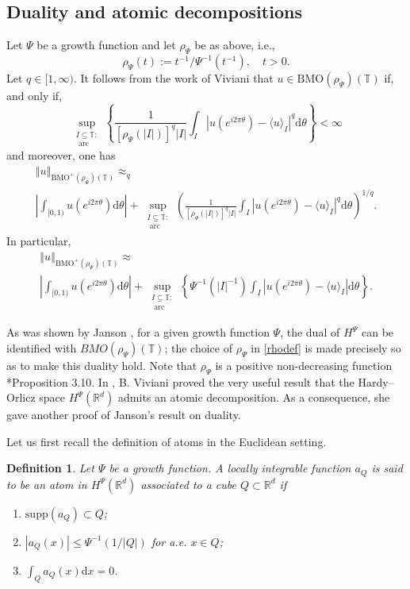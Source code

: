 \documentclass[a4paper, leqno, 10pt]{amsart}
\numberwithin{equation}{section}
\newtheorem{define}[thm]{Definition}
\newcommand{\dd}{\mathrm{d}}
\newcommand{\T}{\mathbb{T}}
\newcommand{\R}{\mathbb{R}}
\newcommand{\norm}[1]{\left\Vert#1\right\Vert}
\newcommand{\abs}[1]{\left|#1\right|}
\begin{document}
%
    
\subsection{Duality and atomic decompositions} Let $\Psi$ be a growth function and let $\rho_{\Psi}$ be as above, i.e.,
\begin{equation}
\rho_{\Psi} (t):=t^{-1} /\Psi^{-1} (t^{-1}), \quad  t > 0. 
\label{rhodef}
\end{equation}
Let $q \in [1, \infty)$. It follows from the work of Viviani \cite{V} that $u \in \mathrm{BMO} (\rho_{\Psi}) (\T)$ if, and only if,
\[
 \sup_{\substack{ I \subseteq \T  : \\  \text{ arc } }} \left\{ \frac{1} { \left[ \rho_{\Psi} (|I|) \right]^q |I|} \int_{I} \abs{u (e^{ i 2 \pi \theta}) - \langle u \rangle_I}^q \dd \theta \right\} < \infty 
\]
and moreover, one has
\begin{multline}\label{BMO_Psi_norms}
\norm{u}_{\mathrm{BMO}^+ (\rho_{\Psi}) (\T)} \approx_q \\
\abs{ \int_{[0,1)} u ( e^{ i 2 \pi \theta} ) \dd \theta} + \sup_{\substack{ I \subseteq \T  : \\  \text{ arc } }}  \left( \frac{1} { \left[ \rho_{\Psi} (|I|) \right]^q |I|}  \int_{I} \abs{u (e^{ i 2 \pi \theta}) - \langle u \rangle_I}^q \dd \theta \right)^{1/q} .
\end{multline}
In particular, 
\begin{multline}\label{BMO_Psi_1}
\norm{u}_{\mathrm{BMO}^+ (\rho_{\Psi}) (\T)} \approx \\
\abs{ \int_{[0,1)} u ( e^{ i 2 \pi \theta} ) \dd \theta} + \sup_{\substack{ I \subseteq \T  : \\  \text{ arc } }} \left\{ \Psi^{-1} ( |I|^{-1} ) \int_{I} \abs{u (e^{ i 2 \pi \theta}) - \langle u \rangle_I} \dd \theta \right\} . 
\end{multline}

As was shown by Janson \cite{J}, for a given growth function $\Psi$, the dual of $H^{\Psi}$ can be identified with $BMO(\rho_{\Psi})(\T)$; the choice of $\rho_{\Psi}$ in \eqref{rhodef} is made precisely so as to make this duality hold. Note that $\rho_{\Psi}$ is a positive non-decreasing function \cite{V}*{Proposition 3.10}. In \cite{V}, B. Viviani proved the very useful result that the Hardy--Orlicz space $H^{\Psi} (\R^d)$ admits an atomic decomposition. As a consequence, she gave another proof of Janson's result on duality. 

Let us first recall the definition of atoms in the Euclidean setting. 
\begin{define}\label{atomdef}
Let $\Psi$ be a growth function. A locally integrable function $a_Q$ is said to be an {\it atom} in $H^{\Psi} (\R^d)$ associated to a cube $Q\subset \R^d$ if 
\begin{enumerate}[label=\rm{\roman*)}]
\item $\mathrm{supp} (a_Q) \subset Q$;
\item $\abs{a_Q(x)} \leq \Psi^{-1}(1/\abs{Q})$ for a.e. $x \in Q$;
\item $\int_Q a_Q (x)\dd x=0$.
\end{enumerate}
\end{define}
\end{document}
